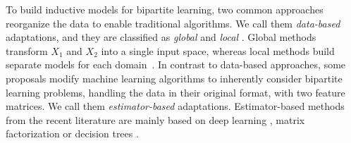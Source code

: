 \documentclass[sn-mathphys-num]{sn-jnl}%
\theoremstyle{thmstyleone}%
\theoremstyle{thmstyletwo}%
\theoremstyle{thmstylethree}%
\begin{document}
To build inductive models for bipartite learning,
two common approaches reorganize the data to enable traditional algorithms. We call them \emph{data-based} adaptations, and they are classified as \emph{global} and \emph{local}  \cite{schrynemackers_classifying_2015}.
Global methods transform $X_1$ and $X_2$ into a single input space, whereas local methods build separate models for each domain~\cite{schrynemackers_classifying_2015}.
%
%
In contrast to data-based approaches, some proposals modify machine learning algorithms to inherently consider bipartite learning problems, handling the data in their original format, with two feature matrices.
We call them \emph{estimator-based} adaptations.
Estimator-based methods from the recent literature are mainly based on deep learning \cite{lin2023comprehensive, bagherian2021machine}, matrix factorization \cite{guo2024rise, chen2022review} or decision trees \cite{pliakos_global_2018,pliakos_integrating_2019,pliakos_network_2019}.
\end{document}
